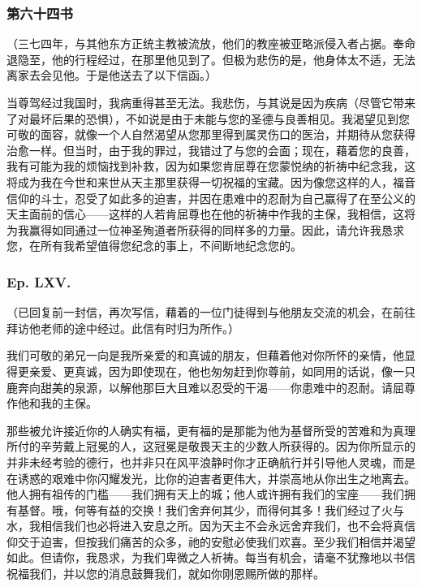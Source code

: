 
\subsubsection{第六十四书}

（三七四年，与其他东方正统主教被流放，他们的教座被亚略派侵入者占据。奉命退隐至，他的行程经过，在那里他见到了。但极为悲伤的是，他身体太不适，无法离家去会见他。于是他送去了以下信函。）\par

当尊驾经过我国时，我病重得甚至无法。我悲伤，与其说是因为疾病（尽管它带来了对最坏后果的恐惧），不如说是由于未能与您的圣德与良善相见。我渴望见到您可敬的面容，就像一个人自然渴望从您那里得到属灵伤口的医治，并期待从您获得治愈一样。但当时，由于我的罪过，我错过了与您的会面；现在，藉着您的良善，我有可能为我的烦恼找到补救，因为如果您肯屈尊在您蒙悦纳的祈祷中纪念我，这将成为我在今世和来世从天主那里获得一切祝福的宝藏。因为像您这样的人，福音信仰的斗士，忍受了如此多的迫害，并因在患难中的忍耐为自己赢得了在至公义的天主面前的信心——这样的人若肯屈尊也在他的祈祷中作我的主保，我相信，这将为我赢得如同通过一位神圣殉道者所获得的同样多的力量。因此，请允许我恳求您，在所有我希望值得您纪念的事上，不间断地纪念您的。\par


\subsubsection{Ep. LXV.}

（已回复前一封信，再次写信，藉着的一位门徒得到与他朋友交流的机会，在前往拜访他老师的途中经过。此信有时归为所作。）\par

我们可敬的弟兄一向是我所亲爱的和真诚的朋友，但藉着他对你所怀的亲情，他显得更亲爱、更真诚，因为即使现在，他也匆匆赶到你尊前，如同用的话说，像一只鹿奔向甜美的泉源，以解他那巨大且难以忍受的干渴——你患难中的忍耐。请屈尊作他和我的主保。\par

那些被允许接近你的人确实有福，更有福的是那能为他为基督所受的苦难和为真理所付的辛劳戴上冠冕的人，这冠冕是敬畏天主的少数人所获得的。因为你所显示的并非未经考验的德行，也并非只在风平浪静时你才正确航行并引导他人灵魂，而是在诱惑的艰难中你闪耀发光，比你的迫害者更伟大，并崇高地从你出生之地离去。他人拥有祖传的门槛——我们拥有天上的城；他人或许拥有我们的宝座——我们拥有基督。哦，何等有益的交换！我们舍弃何其少，而得何其多！我们经过了火与水，我相信我们也必将进入安息之所。因为天主不会永远舍弃我们，也不会将真信仰交于迫害，但按我们痛苦的众多，祂的安慰必使我们欢喜。至少我们相信并渴望如此。但请你，我恳求，为我们卑微之人祈祷。每当有机会，请毫不犹豫地以书信祝福我们，并以您的消息鼓舞我们，就如你刚恩赐所做的那样。\par

